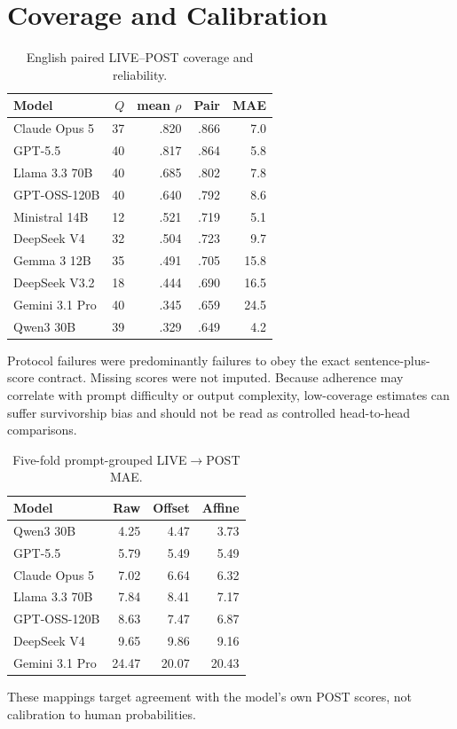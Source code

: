 \section{Coverage and Calibration}
\label{app:coverage}
\begin{table}[h]
\centering\small
\caption{English paired LIVE--POST coverage and reliability.}
\begin{tabular}{lrrrr}
\toprule Model & $Q$ & mean $\rho$ & Pair & MAE\\\midrule
Claude Opus 5 & 37 & .820 & .866 & 7.0\\
GPT-5.5 & 40 & .817 & .864 & 5.8\\
Llama 3.3 70B & 40 & .685 & .802 & 7.8\\
GPT-OSS-120B & 40 & .640 & .792 & 8.6\\
Ministral 14B & 12 & .521 & .719 & 5.1\\
DeepSeek V4 & 32 & .504 & .723 & 9.7\\
Gemma 3 12B & 35 & .491 & .705 & 15.8\\
DeepSeek V3.2 & 18 & .444 & .690 & 16.5\\
Gemini 3.1 Pro & 40 & .345 & .659 & 24.5\\
Qwen3 30B & 39 & .329 & .649 & 4.2\\\bottomrule
\end{tabular}
\end{table}
Protocol failures were predominantly failures to obey the exact sentence-plus-score contract. Missing scores were not imputed. Because adherence may correlate with prompt difficulty or output complexity, low-coverage estimates can suffer survivorship bias and should not be read as controlled head-to-head comparisons.

\begin{table}[h]
\centering\small
\caption{Five-fold prompt-grouped LIVE$\rightarrow$POST MAE.}
\begin{tabular}{lrrr}\toprule Model&Raw&Offset&Affine\\\midrule
Qwen3 30B&4.25&4.47&3.73\\
GPT-5.5&5.79&5.49&5.49\\
Claude Opus 5&7.02&6.64&6.32\\
Llama 3.3 70B&7.84&8.41&7.17\\
GPT-OSS-120B&8.63&7.47&6.87\\
DeepSeek V4&9.65&9.86&9.16\\
Gemini 3.1 Pro&24.47&20.07&20.43\\\bottomrule
\end{tabular}
\end{table}
These mappings target agreement with the model's own POST scores, not calibration to human probabilities.

